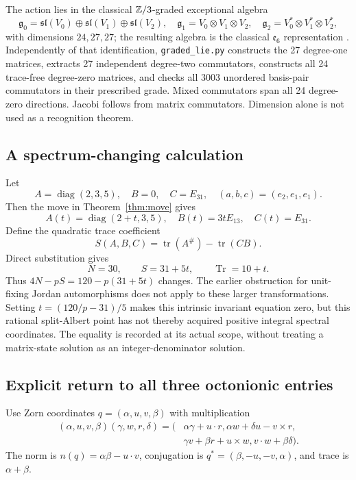 \documentclass[11pt,reqno]{amsart}
\theoremstyle{definition}\newtheorem{definition}[theorem]{Definition}
\theoremstyle{remark}\newtheorem{remark}[theorem]{Remark}
\DeclareMathOperator{\tr}{tr}\DeclareMathOperator{\Tr}{Tr}\DeclareMathOperator{\Ann}{Ann}\DeclareMathOperator{\Fix}{Fix}\DeclareMathOperator{\diag}{diag}\DeclareMathOperator{\lcm}{lcm}\DeclareMathOperator{\Ree}{Re}\DeclareMathOperator{\Jac}{Jac}\DeclareMathOperator{\Pic}{Pic}
\begin{document}
The action lies in the classical $\mathbb Z/3$-graded exceptional algebra
\[
 \mathfrak g_0=\mathfrak{sl}(V_0)\oplus\mathfrak{sl}(V_1)\oplus\mathfrak{sl}(V_2),
 \quad \mathfrak g_1=V_0\otimes V_1\otimes V_2,
 \quad \mathfrak g_2=V_0^*\otimes V_1^*\otimes V_2^*,
\]
with dimensions $24,27,27$; the resulting algebra is the classical
$\mathfrak e_6$ representation \cite[\S6, equations (16)--(20)]{BP}.
Independently of that identification, \texttt{graded\_lie.py} constructs the
27 degree-one matrices, extracts 27 independent degree-two commutators,
constructs all 24 trace-free degree-zero matrices, and checks all 3003 unordered
basis-pair commutators in their prescribed grade. Mixed commutators span all
24 degree-zero directions. Jacobi follows from matrix commutators. Dimension
alone is not used as a recognition theorem.

\subsection{A spectrum-changing calculation}
Let
\[
 A=\diag(2,3,5),\quad B=0,\quad C=E_{31},\quad
 (a,b,c)=(e_2,e_1,e_1).
\]
Then the move in Theorem~\ref{thm:move} gives
\[
 A(t)=\diag(2+t,3,5),\quad B(t)=3tE_{13},\quad C(t)=E_{31}.
\]
Define the quadratic trace coefficient
\[
 S(A,B,C)=\tr(A^\#)-\tr(CB).
\]
Direct substitution gives
\[
 N=30,\qquad S=31+5t,\qquad\Tr=10+t.
\]
Thus $4N-pS=120-p(31+5t)$ changes. The earlier obstruction for
unit-fixing Jordan automorphisms does not apply to these larger transformations.
Setting $t=(120/p-31)/5$ makes this intrinsic invariant equation zero, but this
rational split-Albert point has not thereby acquired positive integral spectral
coordinates. The equality is recorded at its actual scope, without treating a
matrix-state solution as an integer-denominator solution.

\subsection{Explicit return to all three octonionic entries}
Use Zorn coordinates $q=(\alpha,u,v,\beta)$ with multiplication
\begin{align*}
 (\alpha,u,v,\beta)(\gamma,w,r,\delta)
 =(&\alpha\gamma+u\cdot r,
     \alpha w+\delta u-v\times r,\\
   &\gamma v+\beta r+u\times w,
     v\cdot w+\beta\delta).
\end{align*}
The norm is $n(q)=\alpha\beta-u\cdot v$, conjugation is
$q^*=(\beta,-u,-v,\alpha)$, and trace is $\alpha+\beta$.
\end{document}
